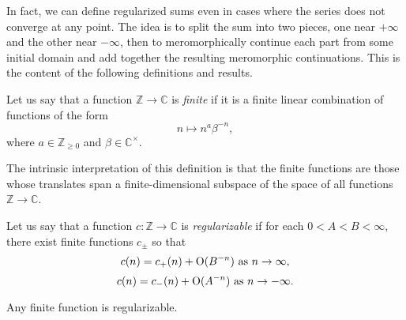 \documentclass[reqno]{amsart}  \numberwithin{theorem}{section} \numberwithin{equation}{section}
\begin{document}
In fact, we can define regularized sums even in cases where the series does not converge at any point.  The idea is to split the sum into two pieces, one near $+\infty$ and the other near $-\infty$, then to meromorphically continue each part from some initial domain and add together the resulting meromorphic continuations.  This is the content of the following definitions and results.
\begin{definition}
  Let us say that a function $\mathbb{Z} \rightarrow \mathbb{C}$ is \emph{finite} if it is a finite linear combination of functions of the form
  \begin{equation*}
    n \mapsto n^a \beta^{- n},
  \end{equation*}
  where $a \in \mathbb{Z}_{\geq 0}$ and $\beta \in \mathbb{C}^\times$.
\end{definition}
\begin{remark}
The intrinsic interpretation of this definition is that the finite functions are those whose translates span a finite-dimensional subspace of the space of all functions $\mathbb{Z} \rightarrow \mathbb{C}$.
\end{remark}
\begin{definition}
  Let us say that a function $c : \mathbb{Z} \rightarrow \mathbb{C}$ is \emph{regularizable} if for each $0 < A < B < \infty$, there exist finite functions $c_{\pm}$ so that
  \begin{equation*}
    c(n) = c_+(n) + \operatorname{O}(B^{-n}) \text{ as } n \rightarrow \infty,
  \end{equation*}
  \begin{equation*}
    c(n) = c_-(n) + \operatorname{O}(A^{-n}) \text{ as } n \rightarrow -\infty.
  \end{equation*}
\end{definition}
\begin{example}
Any finite function is regularizable.
\end{example}
\end{document}
